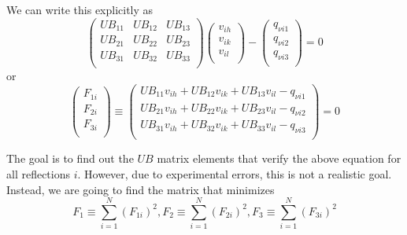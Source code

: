 \documentclass[prb]{revtex4}%
\begin{document}
We can write this explicitly as
\begin{equation}
    \left(
      \begin{array}{ccc}
        UB_{11} & UB_{12} & UB_{13} \\
        UB_{21} & UB_{22} & UB_{23} \\
        UB_{31} & UB_{32} & UB_{33} \\
      \end{array}
    \right)
    \left(
      \begin{array}{c}
        v_{ih} \\
        v_{ik} \\
        v_{il} \\
      \end{array}
    \right) - \left(
                \begin{array}{c}
                  q_{\nu i 1} \\
                  q_{\nu i 2} \\
                  q_{\nu i 3} \\
                \end{array}
              \right)
              = 0
\end{equation}
or
\begin{equation}
    \left(
      \begin{array}{c}
        F_{1i} \\
        F_{2i} \\
        F_{3i} \\
      \end{array}
    \right)
    \equiv\left(
       \begin{array}{c}
         UB_{11}v_{ih} + UB_{12}v_{ik} + UB_{13}v_{il} - q_{\nu i 1}\\
         UB_{21}v_{ih} + UB_{22}v_{ik} + UB_{23}v_{il} - q_{\nu i 2} \\
         UB_{31}v_{ih} + UB_{32}v_{ik} + UB_{33}v_{il} - q_{\nu i 3} \\
       \end{array}
     \right)
    = 0
\end{equation}

The goal is to find out the $UB$ matrix elements that verify the above equation for all reflections $i$.
However, due to experimental errors, this is not a realistic goal. Instead, we are going to find the matrix that minimizes
\begin{equation}
    F_1 \equiv \sum_{i=1}^N(F_{1i})^2, F_2 \equiv \sum_{i=1}^N(F_{2i})^2, F_3 \equiv \sum_{i=1}^N(F_{3i})^2
\end{equation}
\end{document}
